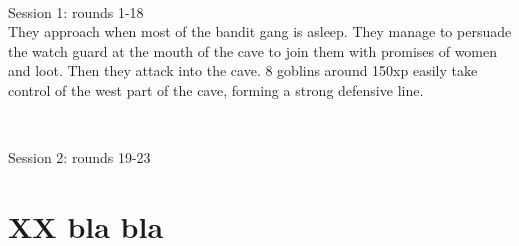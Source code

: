 \

Session 1: rounds 1-18 \\
They approach when most of the bandit gang is asleep. They manage to persuade the watch guard at the mouth of the cave to join them with promises of women and loot. Then they attack into the cave. 8 goblins around 150xp easily take control of the west part of the cave, forming a strong defensive line.

\

Session 2: rounds 19-23 \\







































































\newpage
\section*{XX bla bla}


